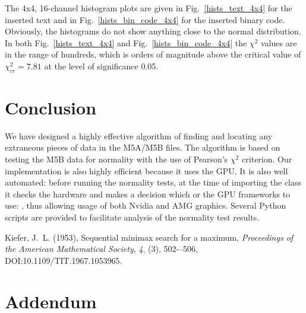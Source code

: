 \documentclass[letterpaper,twoside,12pt]{article}
\begin{document}
The 4x4, 16-channel histogram plots are given in Fig.~\ref{hists_text_4x4} for the inserted text and in Fig.~\ref{hists_bin_code_4x4} for the inserted binary code. Obviously, the histograms do not show anything close to the normal distribution. In both Fig.~\ref{hists_text_4x4} and Fig.~\ref{hists_bin_code_4x4} the $\chi^2$ values are in the range of hundreds, which is orders of magnitude above the critical value of $\chi^2_{cr} = 7.81$ at the level of significance 0.05.  

\section{Conclusion}

We have designed a highly effective algorithm of finding and locating any extraneous pieces of data in the M5A/M5B files. The algorithm is based on testing the M5B data for normality with the use of Pearson's $\chi^2$ criterion. Our implementation is also highly efficient because it uses the GPU. It is also well automated: before running the normality tests, at the time of importing the class \verb@Normtest@ it checks the hardware and makes a decision which or the GPU frameworks to use: \verb@CUDA@ \verb@OpenCL@, thus allowing usage of both Nvidia and AMG graphics. Several Python scripts are provided to facilitate analysis of the normality test results.



\begin{thebibliography}{99}

{Kiefer}, J.~L. (1953), {Sequential minimax search for a maximum}, \textit{Proceedings of the American Mathematical Society}, \textit{4}, (3), 502-–506, DOI:10.1109/TIT.1967.1053965.

\end{thebibliography}

\section*{Addendum}
\end{document}
